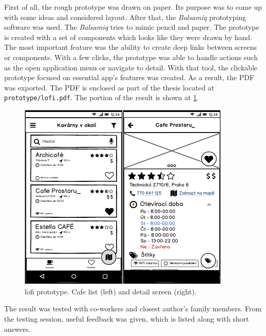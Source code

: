 First of all, the rough prototype was drawn on paper. Its purpose was to come up with some ideas and considered layout. After that, the \textit{Balsamiq} \cite{balsamiq} prototyping software was used. The \textit{Balsamiq} tries to mimic pencil and paper. The prototype is created with a set of components which looks like they were drawn by hand.
The most important feature was the ability to create deep links between screens or components. With a few clicks, the prototype was able to handle actions such as the open application menu or navigate to detail. With that tool, the clickable prototype focused on essential app's features was created. As a result, the PDF was exported. The PDF is enclosed as part of the thesis located at \verb|prototype/lofi.pdf|. The portion of the result is shown at \cref{fig:lofi}.

\begin{figure}[htp]
    \centering
    \includegraphics[width=0.9\textwidth]{img/analysis/lofi.png}
    \caption{\gls{lofi} prototype. Cafe list (left) and detail screen (right).}
    \label{fig:lofi}
\end{figure}

The result was tested with co-workers and closest author's family members. From the testing session, useful feedback was given, which is listed along with short answers. 

